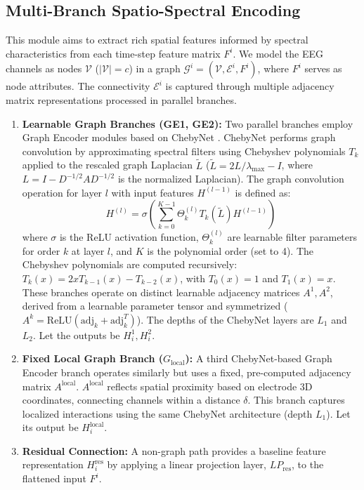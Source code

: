 \documentclass[runningheads]{llncs}
\begin{document}
\subsection{Multi-Branch Spatio-Spectral Encoding}
\label{subsec:graph_encoding_v3}

This module aims to extract rich spatial features informed by spectral characteristics from each time-step feature matrix $F^i$. We model the EEG channels as nodes $\mathcal{V}$ ($|\mathcal{V}|=c$) in a graph $\mathcal{G}^i = (\mathcal{V}, \mathcal{E}^i, F^i)$, where $F^i$ serves as node attributes. The connectivity $\mathcal{E}^i$ is captured through multiple adjacency matrix representations processed in parallel branches.
\begin{enumerate}
    \item \textbf{Learnable Graph Branches (GE1, GE2):} Two parallel branches employ Graph Encoder modules based on ChebyNet \cite{cite_defferrard_chebynet}. ChebyNet performs graph convolution by approximating spectral filters using Chebyshev polynomials $T_k$ applied to the rescaled graph Laplacian $\tilde{L}$ ($\tilde{L} = 2L/\lambda_{\max} - I$, where $L = I - D^{-1/2} A D^{-1/2}$ is the normalized Laplacian). The graph convolution operation for layer $l$ with input features $H^{(l-1)}$ is defined as: \begin{equation}
            H^{(l)} = \sigma\left( \sum_{k=0}^{K-1} \Theta_k^{(l)} T_k(\tilde{L}) H^{(l-1)} \right)
            \label{eq:chebynet}
        \end{equation}
        where $\sigma$ is the ReLU activation function, $\Theta_k^{(l)}$ are learnable filter parameters for order $k$ at layer $l$, and $K$ is the polynomial order (set to 4). The Chebyshev polynomials are computed recursively: $T_k(x) = 2x T_{k-1}(x) - T_{k-2}(x)$, with $T_0(x)=1$ and $T_1(x)=x$. These branches operate on distinct learnable adjacency matrices $A^1, A^2$, derived from a learnable parameter tensor and symmetrized ($A^k = \text{ReLU}(\text{adj}_k + \text{adj}_k^T)$). The depths of the ChebyNet layers are $L_1$ and $L_2$. Let the outputs be $H^1_i, H^2_i$.
    \item \textbf{Fixed Local Graph Branch ($G_{\text{local}}$):} A third ChebyNet-based Graph Encoder branch operates similarly but uses a fixed, pre-computed adjacency matrix $A^{\text{local}}$. $A^{\text{local}}$ reflects spatial proximity based on electrode 3D coordinates, connecting channels within a distance $\delta$. This branch captures localized interactions using the same ChebyNet architecture (depth $L_1$). Let its output be $H^{\text{local}}_i$.
    \item \textbf{Residual Connection:} A non-graph path provides a baseline feature representation $H^{\text{res}}_i$ by applying a linear projection layer, $LP_{\text{res}}$, to the flattened input $F^i$.
\end{enumerate}
\end{document}
